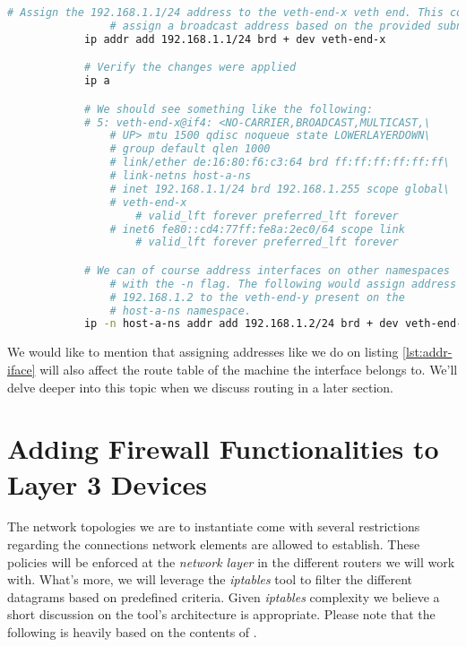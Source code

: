         \begin{lstlisting}[language = bash, caption = Addressing an Interface., label = lst:addr-iface]
            # Assign the 192.168.1.1/24 address to the veth-end-x veth end. This command will automatically
                # assign a broadcast address based on the provided subnet mask (i.e. /24)
            ip addr add 192.168.1.1/24 brd + dev veth-end-x

            # Verify the changes were applied
            ip a

            # We should see something like the following:
            # 5: veth-end-x@if4: <NO-CARRIER,BROADCAST,MULTICAST,\
                # UP> mtu 1500 qdisc noqueue state LOWERLAYERDOWN\
                # group default qlen 1000
                # link/ether de:16:80:f6:c3:64 brd ff:ff:ff:ff:ff:ff\
                # link-netns host-a-ns
                # inet 192.168.1.1/24 brd 192.168.1.255 scope global\
                # veth-end-x
                    # valid_lft forever preferred_lft forever
                # inet6 fe80::cd4:77ff:fe8a:2ec0/64 scope link
                    # valid_lft forever preferred_lft forever

            # We can of course address interfaces on other namespaces
                # with the -n flag. The following would assign address
                # 192.168.1.2 to the veth-end-y present on the
                # host-a-ns namespace.
            ip -n host-a-ns addr add 192.168.1.2/24 brd + dev veth-end-y
        \end{lstlisting}

        We would like to mention that assigning addresses like we do on listing \ref{lst:addr-iface} will also affect the route table of the machine the interface belongs to. We'll delve deeper into this topic when we discuss routing in a later section.\\

    \section{Adding Firewall Functionalities to Layer 3 Devices}
        The network topologies we are to instantiate come with several restrictions regarding the connections network elements are allowed to establish. These policies will be enforced at the \textit{network layer} in the different routers we will work with. What's more, we will leverage the \textit{iptables} tool to filter the different datagrams based on predefined criteria. Given \textit{iptables} complexity we believe a short discussion on the tool's architecture is appropriate. Please note that the following is heavily based on the contents of \cite{bib:man-iptables}.\\

